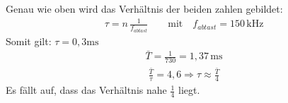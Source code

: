 Genau wie oben wird das Verhältnis der beiden zahlen gebildet:
\begin{align}
    \tau = n \, \frac{1}{f_{abtast}} \qquad \text{mit} \quad f_{abtast} = 150 \, \text{kHz}
\end{align}
Somit gilt: $\tau = 0,3 \text{ms}$ \\
\begin{align}
    \bar{T} = \frac{1}{730} = 1,37 \, \text{ms}
\end{align}
\begin{align}
    \frac{\bar{T}}{\tau} = 4,6  \Rightarrow \tau \approx \frac{\bar{T}}{4}
\end{align}
Es fällt auf, dass das Verhältnis nahe $\frac{1}{4}$ liegt.